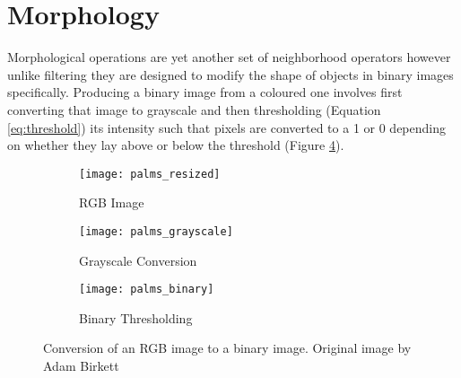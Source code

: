 \section{Morphology}

Morphological operations are yet another set of neighborhood operators however unlike filtering they are designed to modify the shape of objects in binary images specifically. Producing a binary image from a coloured one involves first converting that image to grayscale and then thresholding (Equation \ref{eq:threshold}) its intensity such that pixels are converted to a 1 or 0 depending on whether they lay above or below the threshold (Figure \ref{fig:thresholding}).

\begin{figure}[htbp]
    \centering
    \begin{subfigure}[b]{0.3\textwidth}
        \texttt{[image: palms\_resized]}
        \caption{RGB Image}
        \label{fig:emu_noise}
    \end{subfigure}
    \begin{subfigure}[b]{0.3\textwidth}
        \texttt{[image: palms\_grayscale]}
        \caption{Grayscale Conversion}
        \label{fig:emu_gauss}
    \end{subfigure}
    \begin{subfigure}[b]{0.3\textwidth}
        \texttt{[image: palms\_binary]}
        \caption{Binary Thresholding}
        \label{fig:emu_median}
    \end{subfigure}
    \captionsetup{format = hang}
    \caption{Conversion of an RGB image to a binary image. Original image by Adam Birkett}
    \label{fig:thresholding}
\end{figure}